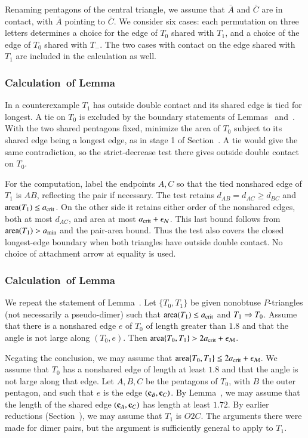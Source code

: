 Renaming pentagons of the central triangle, we assume that $\bar A$
and $\bar C$ are in contact, with $\bar A$ pointing to $\bar C$.  We
consider six cases: each permutation on three letters determines a
choice for the edge of $T_0$ shared with $T_1$, and a choice of the
edge of $T_0$ shared with $T_-$. The two cases with contact on the
edge shared with $T_1$ are included in the calculation as well.

\subsubsection{Calculation~of Lemma~}

In a counterexample $T_1$ has outside double contact and its shared
edge is tied for longest. A tie on $T_0$ is excluded by the boundary
statements of Lemmas~ and~.
With the two shared pentagons fixed, minimize the area of $T_0$
subject to its shared edge being a longest edge, as in stage 1 of
Section~. A tie would give the same contradiction,
so the strict-decrease test there gives outside double contact on $T_0$.

For the computation, label the endpoints $A,C$ so that the tied
nonshared edge of $T_1$ is $AB$, reflecting the pair if necessary.
The test retains $d_{AB}=d_{AC}\ge d_{BC}$ and ${\operatorname{area}}(T_1)\le a_\text{crit}$.
On the other side it retains either order of the nonshared edges,
both at most $d_{AC}$, and area at most $a_\text{crit}+\epsilon_{\mathcal N}$. This last
bound follows from ${\operatorname{area}}(T_1)>a_\text{min}$ and the pair-area bound.
Thus the test also covers the closed longest-edge boundary when
both triangles have outside double contact. No choice of attachment
arrow at equality is used.

\subsubsection{Calculation~of Lemma~} %

We repeat the statement of Lemma~.  Let $\{T_0,T_1\}$
be given nonobtuse $P$-triangles (not necessarily a pseudo-dimer) such that
${\operatorname{area}}(T_1)\le a_\text{crit}$ and $T_1\Rightarrow T_0$.  Assume that there is a
nonshared edge $e$ of $T_0$ of length greater than $1.8$ and that the
angle is not large along $(T_0,e)$.  Then ${\operatorname{area}}\{T_0,T_1\} > 2a_\text{crit}
+ \epsilon_{\mathcal M}$. %

Negating the conclusion, we may assume that ${\operatorname{area}}\{T_0,T_1\}\le
2a_\text{crit} + \epsilon_{\mathcal M}$.  We assume that $T_0$ has a nonshared edge of length
at least $1.8$ and that the angle is not large along that edge.
Let $A,B,C$ be the pentagons of $T_0$, with $B$ the outer pentagon,
and such that $e$ is the edge $({\mathbf c}_B,{\mathbf c}_C)$.
By Lemma~, we may assume that the length of the
shared edge $({\mathbf c}_A,{\mathbf c}_C)$ has length at least $1.72$.
By earlier reductions (Section~), we may assume
that $T_1$ is $O2C$.  The arguments there were made for dimer pairs, but the argument
is sufficiently general to apply to $T_1$.

